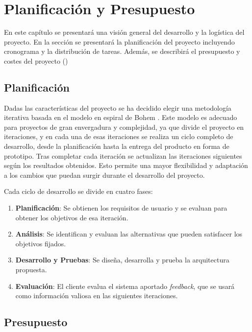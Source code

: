 \chapter{Planificación y Presupuesto}\label{chap:planificacion}
En este capítulo se presentará una visión general del desarrollo y la logística del proyecto. En la sección  se presentará la planificación del proyecto incluyendo cronograma y la distribución de tareas. Además, se describirá el presupuesto y costes del proyecto () 

\section{Planificación}\label{sec:planificacion}

Dadas las características del proyecto se ha decidido elegir una metodología iterativa basada en el modelo en espiral de Bohem \cite{ModeloEspiral}. Este modelo es adecuado para proyectos de gran envergadura y complejidad, ya que divide el proyecto en iteraciones, y en cada una de esas iteraciones se realiza un ciclo completo de desarrollo, desde la planificación hasta la entrega del producto en forma de prototipo. Tras completar cada iteración se actualizan las iteraciones siguientes según los resultados obtenidos. Esto permite una mayor flexibilidad y adaptación a los cambios que puedan surgir durante el desarrollo del proyecto.

Cada ciclo de desarrollo se divide en cuatro fases:

\begin{enumerate}
    \item \textbf{Planificación}: Se obtienen los requisitos de usuario y se evaluan para obtener los objetivos de esa iteración.
    \item \textbf{Análisis}: Se identifican y evaluan las alternativas que pueden satisfacer los objetivos fijados.
    \item \textbf{Desarrollo y Pruebas}: Se diseña, desarrolla y prueba la arquitectura propuesta.
    \item \textbf{Evaluación}: El cliente evalua el sistema aportado \textit{feedback}, que se usará como información valiosa en las siguientes iteraciones.
\end{enumerate}



\section{Presupuesto}\label{sec:presupuesto}
